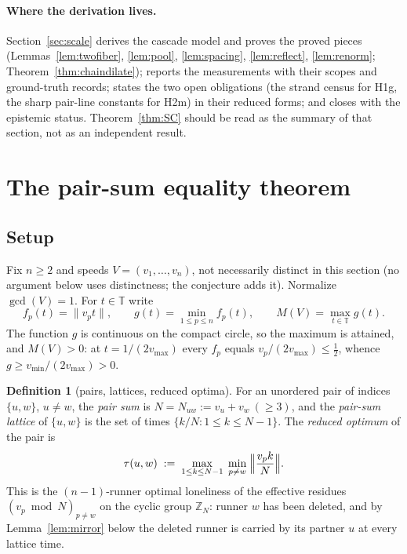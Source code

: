 \documentclass[11pt,a4paper]{article}
\numberwithin{equation}{section}
\theoremstyle{plain}
\theoremstyle{plain}
\theoremstyle{definition}
\newtheorem{definition}[theorem]{Definition}
\theoremstyle{remark}
\newcommand{\Z}{\mathbb{Z}}
\newcommand{\T}{\mathbb{T}}
\newcommand{\wnc}[1]{\lVert #1 \rVert}
\begin{document}
\paragraph{Where the derivation lives.}
Section~\ref{sec:scale} derives the cascade model and proves the proved
pieces (Lemmas~\ref{lem:twofiber}, \ref{lem:pool}, \ref{lem:spacing},
\ref{lem:reflect}, \ref{lem:renorm}; Theorem~\ref{thm:chaindilate});
reports the measurements with their scopes and ground-truth records;
states the two open obligations (the strand census for H1g, the sharp
pair-line constants for H2m) in their reduced forms; and closes with
the epistemic status. Theorem~\ref{thm:SC} should be read as the
summary of that section, not as an independent result.


\section{The pair-sum equality theorem}\label{sec:equality}

\subsection{Setup}

Fix $n\ge 2$ and speeds $V=(v_1,\dots,v_n)$, not necessarily distinct in
this section (no argument below uses distinctness; the conjecture adds it).
Normalize $\gcd(V)=1$. For $t\in\T$ write
\[
f_p(t)=\wnc{v_p t},\qquad
g(t)=\min_{1\le p\le n} f_p(t),\qquad
M(V)=\max_{t\in\T} g(t).
\]
The function $g$ is continuous on the compact circle, so the maximum is
attained, and $M(V)>0$: at $t=1/(2v_{\max})$ every $f_p$ equals
$v_p/(2v_{\max})\le \tfrac12$, whence $g\ge v_{\min}/(2v_{\max})>0$.

\begin{definition}[pairs, lattices, reduced optima]\label{def:pair}
For an unordered pair of indices $\{u,w\}$, $u\ne w$, the \emph{pair sum}
is $N=N_{uw}:=v_u+v_w\ (\ge 3)$, and the \emph{pair-sum lattice} of
$\{u,w\}$ is the set of times $\{k/N : 1\le k\le N-1\}$. The
\emph{reduced optimum} of the pair is
\[
\tau(u,w)\;:=\;\max_{1\le k\le N-1}\;
\min_{p\ne w}\;\Bigl\lVert \frac{v_p k}{N}\Bigr\rVert .
\]
This is the $(n{-}1)$-runner optimal loneliness of the effective residues
$(v_p\bmod N)_{p\ne w}$ on the cyclic group $\Z_N$: runner $w$ has been
deleted, and by Lemma~\ref{lem:mirror} below the deleted runner is carried
by its partner $u$ at every lattice time.
\end{definition}
\end{document}

